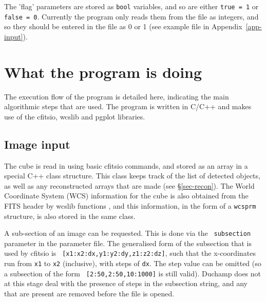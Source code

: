 \documentclass[12pt,a4paper]{article}
\begin{document}
The 'flag' parameters are stored as {\tt bool} variables, and so are
either {\tt true = 1} or {\tt false = 0}. Currently the program only
reads them from the file as integers, and so they should be entered in
the file as 0 or 1 (see example file in Appendix~\ref{app-input}).

\section{What the program is doing}
\label{sec-flow}

The execution flow of the program is detailed here, indicating the
main algorithmic steps that are used. The program is written in C/C++
and makes use of the {\sc cfitsio}, {\sc wcslib} and {\sc pgplot}
libraries. 

%

\subsection{Image input}

The cube is read in using basic {\sc cfitsio} commands, and stored as
an array in a special C++ class structure. This class keeps track of
the list of detected objects, as well as any reconstructed arrays that
are made (see \S\ref{sec-recon}). The World Coordinate System (WCS)
information for the cube is also obtained from the FITS header by {\sc
wcslib} functions \citep{greisen02, calabretta02}, and this
information, in the form of a {\tt wcsprm} structure, is also stored
in the same class.

A sub-section of an image can be requested. This is done via the {\tt
subsection} parameter in the parameter file. The generalised form of
the subsection that is used by {\sc cfitsio} is {\tt
[x1:x2:dx,y1:y2:dy,z1:z2:dz]}, such that the x-coordinates run from
{\tt x1} to {\tt x2} (inclusive), with steps of {\tt dx}. The step
value can be omitted (so a subsection of the form {\tt
[2:50,2:50,10:1000]} is still valid). Duchamp does not at this
stage deal with the presence of steps in the subsection string, and
any that are present are removed before the file is opened.
\end{document}
